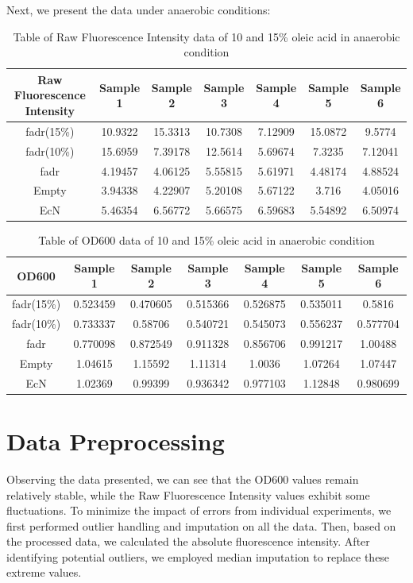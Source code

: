 \documentclass[UTF8]{article}
\begin{document}
Next, we present the data under anaerobic conditions:

\begin{table}[h]
	\centering
	\begin{tabular}{|c|c|c|c|c|c|c|}
		\hline
		Raw Fluorescence Intensity & Sample 1 & Sample 2 & Sample 3 & Sample 4 & Sample 5 & Sample 6 \\ \hline
		fadr(15\%) & 10.9322 & 15.3313 & 10.7308 & 7.12909 & 15.0872 & 9.5774 \\ \hline
		fadr(10\%) & 15.6959 & 7.39178 & 12.5614 & 5.69674 & 7.3235 & 7.12041 \\ \hline
		fadr & 4.19457 & 4.06125 & 5.55815 & 5.61971 & 4.48174 & 4.88524 \\ \hline
		Empty & 3.94338 & 4.22907 & 5.20108 & 5.67122 & 3.716 & 4.05016 \\ \hline
		EcN & 5.46354 & 6.56772 & 5.66575 & 6.59683 & 5.54892 & 6.50974 \\ \hline
	\end{tabular}
	\caption{Table of Raw Fluorescence Intensity data of 10 and 15\% oleic acid in anaerobic condition}
\end{table}

\begin{table}[h]
	\centering
	\begin{tabular}{|c|c|c|c|c|c|c|}
		\hline
		OD600 & Sample 1 & Sample 2 & Sample 3 & Sample 4 & Sample 5 & Sample 6 \\ \hline
		fadr(15\%) & 0.523459 & 0.470605 & 0.515366 & 0.526875 & 0.535011 & 0.5816 \\ \hline
		fadr(10\%) & 0.733337 & 0.58706 & 0.540721 & 0.545073 & 0.556237 & 0.577704 \\ \hline
		fadr & 0.770098 & 0.872549 & 0.911328 & 0.856706 & 0.991217 & 1.00488 \\ \hline
		Empty & 1.04615 & 1.15592 & 1.11314 & 1.0036 & 1.07264 & 1.07447 \\ \hline
		EcN & 1.02369 & 0.99399 & 0.936342 & 0.977103 & 1.12848 & 0.980699 \\ \hline
	\end{tabular}
	\caption{Table of OD600 data of 10 and 15\% oleic acid in anaerobic condition}
\end{table}


\section{Data Preprocessing}


Observing the data presented, we can see that the OD600 values remain relatively stable, while the Raw Fluorescence Intensity values exhibit some fluctuations. To minimize the impact of errors from individual experiments, we first performed outlier handling and imputation on all the data. Then, based on the processed data, we calculated the absolute fluorescence intensity. After identifying potential outliers, we employed median imputation to replace these extreme values.
\end{document}
